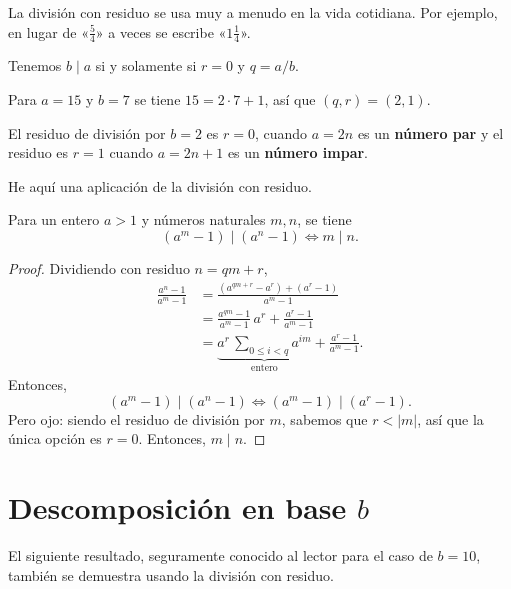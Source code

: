 La división con residuo se usa muy a menudo en la vida cotidiana. Por ejemplo,
en lugar de «$\frac{5}{4}$» a veces se escribe «$1\frac{1}{4}$».

\begin{ejemplo}
  Tenemos $b \mid a$ si y solamente si $r = 0$ y $q = a/b$.
\end{ejemplo}

\begin{ejemplo}
  Para $a = 15$ y $b = 7$ se tiene $15 = 2\cdot 7 + 1$, así que $(q,r) = (2,1)$.
\end{ejemplo}

\begin{ejemplo}
  El residuo de división por $b = 2$ es $r = 0$, cuando $a = 2n$ es un
  \textbf{número par} y el residuo es $r = 1$ cuando $a = 2n+1$ es un
  \textbf{número impar}.
\end{ejemplo}

He aquí una aplicación de la división con residuo.

\begin{proposicion}
  Para un entero $a > 1$ y números naturales $m, n$, se tiene
  $$(a^m - 1) \mid (a^n-1) \iff m \mid n.$$

  \begin{proof}
    Dividiendo con residuo
    $n = qm + r$,
    \begin{align*}
      \frac{a^n-1}{a^m-1} & = \frac{(a^{qm + r} - a^r) + (a^r - 1)}{a^m - 1} \\
                          & = \frac{a^{qm} - 1}{a^m - 1}\,a^r + \frac{a^r - 1}{a^m - 1} \\
                          & = \underbrace{a^r \, \sum_{0 \le i < q} a^{im}}_{\text{entero}} + \frac{a^r - 1}{a^m - 1}.
    \end{align*}
    Entonces,
    $$(a^m - 1) \mid (a^n-1) \iff (a^m - 1) \mid (a^r - 1).$$
    Pero ojo: siendo el residuo de división por $m$, sabemos que $r < |m|$, así
    que la única opción es $r = 0$. Entonces, $m \mid n$.
  \end{proof}
\end{proposicion}


\section{Descomposición en base $b$}

El siguiente resultado, seguramente conocido al lector para el caso de $b = 10$,
también se demuestra usando la división con residuo.

